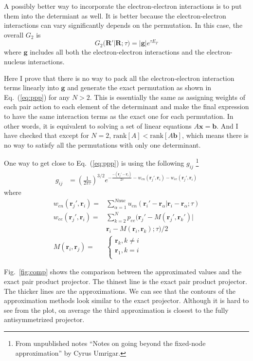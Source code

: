 \documentclass[%
reprint,
nofootinbib,
amsmath,amssymb,
aps,
prl,
]{revtex4-1}
\begin{document}
A possibly better way to incorporate the electron-electron interactions is to put them into the determiant as well.
It is better because the electron-electron interactions can vary significantly depends on the permutation.
In this case, the overall $G_2$ is
\begin{equation}
\label{eq:G2pppUee3}
G_2(\bm{R'}|\bm{R};\tau) = |\bm{g}|e^{\tau E_T}
\end{equation}
where $\bm{g}$ includes all both the electron-electron interactions and the electron-nucleus interactions.

Here I prove that there is no way to pack all the electron-electron interaction terms linearly into $\bm{g}$ and generate the exact permutation as shown in Eq.~(\ref{eq:ppp}) for any $N>2$.
This is essentially the same as assigning weights of each pair action to each element of the determinant and make the final expression to have the same interaction terms as the exact one for each permutation.
In other words, it is equivalent to solving a set of linear equations $A\bm{x}=\bm{b}$.
And I have checked that except for $N=2$, $\mathrm{rank}[A] < \mathrm{rank}[A \bm{b}]$, which means there is no way to satisfy all the permutations with only one determinant.

One way to get close to Eq.~(\ref{eq:ppp}) is using the following $g_{ij}$%
\footnote{From unpublished notes ``Notes on going beyond the fixed-node approximation'' by Cyrus Umrigar.}
\begin{align}
\label{eq:eq:gUee3}
g_{ij} & =
\left(\frac{1}{2\pi\tau} \right )^{3/2}e^{-\frac{-(\bm{r}_j'-\bm{r}_i)}{2\tau}-w_{en}(\bm{r}_j',\bm{r}_i)-w_{ee}(\bm{r}_j', \bm{r}_i)}
\end{align}
where
\begin{align}
w_{en}(\bm{r}_j',\bm{r}_i) = &
\sum\limits_{\alpha=1}^{N\mathrm{nuc}}u_{en}(\bm{r}_i'-\bm{r}_\alpha|\bm{r}_i-\bm{r}_\alpha;\tau)\\
w_{ee}(\bm{r}_j',\bm{r}_i) = &
\sum\limits_{k=2}^{N}p_{ee}(\bm{r}_j'-M(\bm{r}_j',\bm{r}_k')|\\
 & \bm{r}_i-M(\bm{r}_i,\bm{r}_k);\tau)/2\\
M(\bm{r}_i,\bm{r}_j) = &
\left\{\begin{matrix}
\bm{r}_k, k \neq i\\
\bm{r}_1, k = i\\
\end{matrix}\right.
\end{align}

Fig.~\ref{fig:comp} shows the comparison between the approximated values and the exact pair product projector.
The thinest line is the exact pair product projector.
The thicker lines are the approximations.
We can see that the contours of the approximation methods look similar to the exact projector.
Although it is hard to see from the plot, on average the third approximation is closest to the
fully antisymmetrized projector.
\end{document}
